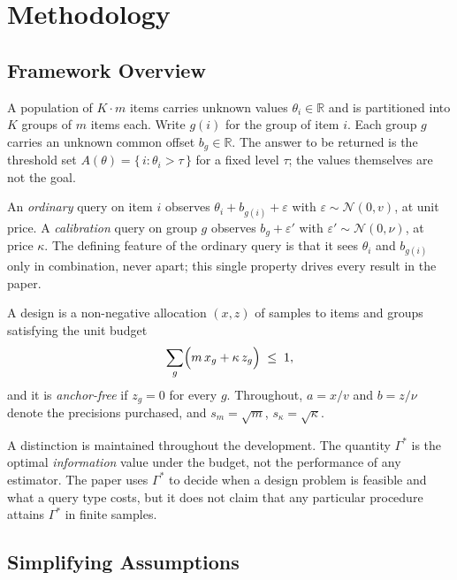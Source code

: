 \documentclass[conference]{IEEEtran}
\theoremstyle{definition}
\begin{document}
\section{Methodology}
\label{sec:setting}

\subsection{Framework Overview}

A population of $K\cdot m$ items carries unknown values $\theta_{i}\in\mathbb{R}$ and is
partitioned into $K$ groups of $m$ items each. Write $g(i)$ for the group of item $i$. Each
group $g$ carries an unknown common offset $b_{g}\in\mathbb{R}$. The answer to be returned
is the threshold set $A(\theta)=\{\,i:\theta_{i}>\tau\,\}$ for a fixed level $\tau$; the
values themselves are not the goal.

An \emph{ordinary} query on item $i$ observes $\theta_{i}+b_{g(i)}+\varepsilon$ with
$\varepsilon\sim\mathcal{N}(0,v)$, at unit price. A \emph{calibration} query on group $g$
observes $b_{g}+\varepsilon'$ with $\varepsilon'\sim\mathcal{N}(0,\nu)$, at price $\kappa$.
The defining feature of the ordinary query is that it sees $\theta_{i}$ and $b_{g(i)}$ only
in combination, never apart; this single property drives every result in the paper.

A design is a non-negative allocation $(x,z)$ of samples to items and groups satisfying the
unit budget
\begin{equation}
\sum_{g}\Bigl( m\,x_{g} + \kappa\,z_{g} \Bigr) \;\le\; 1 ,
\label{eq:budget}
\end{equation}
and it is \emph{anchor-free} if $z_{g}=0$ for every $g$. Throughout, $a=x/v$ and $b=z/\nu$
denote the precisions purchased, and $s_{m}=\sqrt{m}$, $s_{\kappa}=\sqrt{\kappa}$.

A distinction is maintained throughout the development. The quantity
$\Gamma^{*}$ is the optimal \emph{information} value under the budget, not the performance
of any estimator. The paper uses $\Gamma^{*}$ to decide when a design problem is feasible
and what a query type costs, but it does not claim that any particular procedure attains
$\Gamma^{*}$ in finite samples.

\subsection{Simplifying Assumptions}
\end{document}
